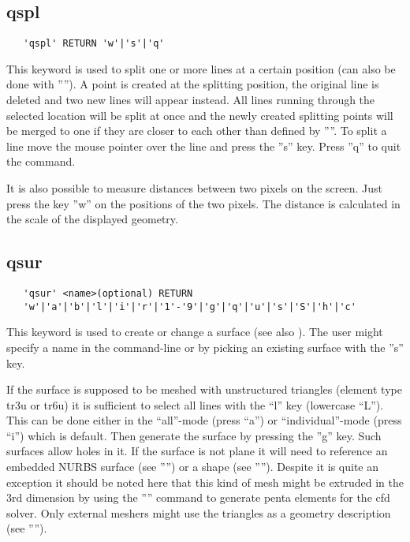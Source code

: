 \documentclass{article}
\begin{document}
\subsection{\label{qspl}qspl}
\begin{verbatim}
   'qspl' RETURN 'w'|'s'|'q' 
\end{verbatim}
This keyword is used to split one or more lines at a certain position (can also be done with ''''). A point is created at the splitting position, the original line is deleted and two new lines will appear instead. All lines running through the selected location will be split at once and the newly created splitting points will be merged to one if they are closer to each other than defined by ''''. To split a line move the mouse pointer over the line and press the ''s'' key. Press ''q'' to quit the command. 

It is also possible to measure distances between two pixels on the screen. Just press the key ''w'' on the positions of the two pixels. The distance is calculated in the scale of the displayed geometry.

\subsection{\label{qsur}qsur}
\begin{verbatim}
   'qsur' <name>(optional) RETURN
   'w'|'a'|'b'|'l'|'i'|'r'|'1'-'9'|'g'|'q'|'u'|'s'|'S'|'h'|'c'
\end{verbatim}
This keyword is used to create or change a surface (see also ). The user might specify a name in the command-line or by picking an existing surface with the ''s'' key.

If the surface is supposed to be meshed with unstructured triangles (element type tr3u or tr6u) it is sufficient to select all lines with the ``l'' key (lowercase ``L''). This can be done either in the ``all''-mode (press ``a'') or ``individual''-mode (press ``i'') which is default. Then generate the surface by pressing the ''g'' key. Such surfaces allow holes in it. If the surface is not plane it will need to reference an embedded NURBS surface (see '''') or a shape (see ''''). Despite it is quite an exception it should be noted here that this kind of mesh might be extruded in the 3rd dimension by using the '''' command to generate penta elements for the cfd solver. Only external meshers might use the triangles as a geometry description (see '''').
\end{document}
